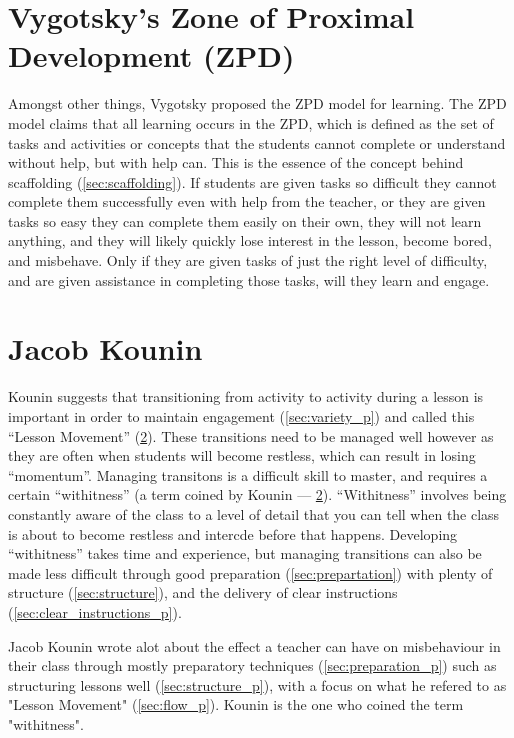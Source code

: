 \documentclass[12pt]{report}
\begin{document}
\section{Vygotsky's Zone of Proximal Development (ZPD)}
\label{sec:zpd_theory}


Amongst other things, Vygotsky proposed the ZPD model for learning. The ZPD model claims that all learning occurs in the ZPD, which is defined as the set of tasks and activities or concepts that the students cannot complete or understand without help, but with help can. This is the essence of the concept behind scaffolding (\ref{sec:scaffolding}). If students are given tasks so difficult they cannot complete them successfully even with help from the teacher, or they are given tasks so easy they can complete them easily on their own, they will not learn anything, and they will likely quickly lose interest in the lesson, become bored, and misbehave. Only if they are given tasks of just the right level of difficulty, and are given assistance in completing those tasks, will they learn and engage.



\section{Jacob Kounin}
\label{sec:kounin_theory}

Kounin suggests that transitioning from activity to activity during a lesson is important in order to maintain engagement (\ref{sec:variety_p}) and called this ``Lesson Movement'' (\ref{sec:kounin_theory}). These transitions need to be managed well however as they are often when students will become restless, which can result in losing ``momentum''. Managing transitons is a difficult skill to master, and requires a certain ``withitness'' (a term coined by Kounin  --- \ref{sec:kounin_theory}). ``Withitness'' involves being constantly aware of the class to a level of detail that you can tell when the class is about to become restless and intercde before that happens. Developing ``withitness'' takes time and experience, but managing transitions can also be made less difficult through good preparation (\ref{sec:prepartation}) with plenty of structure (\ref{sec:structure}), and the delivery of clear instructions (\ref{sec:clear_instructions_p}).

Jacob Kounin wrote alot about the effect a teacher can have on misbehaviour in their class through mostly preparatory techniques (\ref{sec:preparation_p}) such as structuring lessons well (\ref{sec:structure_p}), with a focus on what he refered to as "Lesson Movement" (\ref{sec:flow_p}). Kounin is the one who coined the term "withitness".
\end{document}
